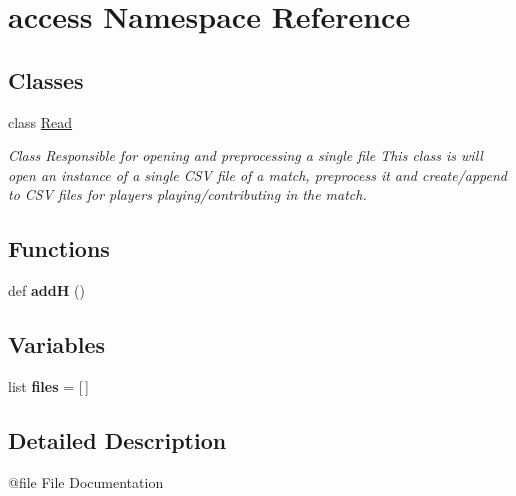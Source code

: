 \hypertarget{namespaceaccess}{}\section{access Namespace Reference}
\label{namespaceaccess}
\subsection*{Classes}
\begin{DoxyCompactItemize}
\item 
class \hyperlink{classaccess_1_1Read}{Read}
\begin{DoxyCompactList}\small\item\em Class Responsible for opening and preprocessing a single file This class is will open an instance of a single C\+SV file of a match, preprocess it and create/append to C\+SV files for players playing/contributing in the match. \end{DoxyCompactList}\end{DoxyCompactItemize}
\subsection*{Functions}
\begin{DoxyCompactItemize}
\item 
\mbox{\label{namespaceaccess_a183ae43f0e30d2b6f0d9c7b150afbf84}} 
def {\bfseries addH} ()
\end{DoxyCompactItemize}
\subsection*{Variables}
\begin{DoxyCompactItemize}
\item 
\mbox{\label{namespaceaccess_afd9f62f0198063032760b0959d3c7b5d}} 
list {\bfseries files} = \mbox{[}$\,$\mbox{]}
\end{DoxyCompactItemize}


\subsection{Detailed Description}
\begin{DoxyVerb}@file File Documentation
\end{DoxyVerb}
 